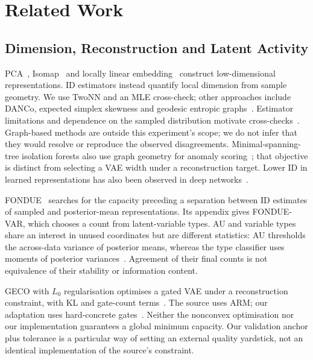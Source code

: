 \section{Related Work}\label{sec:related}

\subsection{Dimension, Reconstruction and Latent Activity}
PCA~\cite{tippingbishop1999ppca}, Isomap~\cite{tenenbaum2000isomap} and
locally linear embedding~\cite{roweis2000lle} construct low-dimensional
representations. ID estimators instead quantify local dimension from
sample geometry. We use TwoNN and an MLE cross-check; other approaches
include DANCo, expected simplex skewness and geodesic entropic
graphs~\cite{ceruti2014danco,johnsson2015ess,costa2004geodesic}.
Estimator limitations and dependence on the sampled distribution motivate
cross-checks~\cite{camastra2016intrinsic,allegra2020data}.
Graph-based methods are outside this experiment's scope; we do not infer
that they would resolve or reproduce the observed disagreements.
Minimal-spanning-tree isolation forests also use graph geometry for
anomaly scoring~\cite{galka2022isolation}; that objective is distinct from
selecting a VAE width under a reconstruction target.
Lower ID in learned representations has also been observed in deep
networks~\cite{ansuini2019intrinsic,pope2021intrinsic}.

FONDUE~\cite{bonheme2022fondue} searches for the capacity preceding a
separation between ID estimates of sampled and posterior-mean
representations. Its appendix gives FONDUE-VAR, which chooses a count from
latent-variable types. AU and variable types share an interest in unused
coordinates but are different statistics: AU thresholds the across-data
variance of posterior means, whereas the type classifier uses moments of
posterior variances~\cite{bonheme2023active}. Agreement of their final
counts is not equivalence of their stability or information content.

GECO with $L_0$ regularisation optimises a gated VAE under a reconstruction
constraint, with KL and gate-count terms~\cite{deboom2020geco,rezende2018geco}.
The source uses ARM; our adaptation uses hard-concrete
gates~\cite{louizos2018l0}. Neither the nonconvex optimisation nor our
implementation guarantees a global minimum capacity. Our validation
anchor plus tolerance is a particular way of setting an external quality
yardstick, not an identical implementation of the source's constraint.

